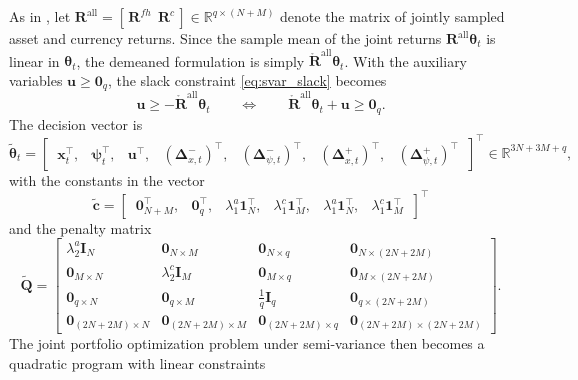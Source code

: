 As in , let $\bm{R}^{\text{all}} = [\, \bm{R}^{fh}\ \ \bm{R}^c \,] \in
\mathbb{R}^{q \times (N+M)}$ denote the matrix of jointly sampled asset and currency returns. Since the sample mean of
the joint returns $\bm{R}^{\text{all}} \bm{\theta}_t$ is linear in $\bm{\theta}_t$, the demeaned formulation is simply
$\mathring{\bm{R}}^{\text{all}} \bm{\theta}_t$. With the auxiliary variables $\bm{u} \ge \bm{0}_q$, the slack
constraint \eqref{eq:svar_slack} becomes
\begin{equation*}
    \bm{u} \ge -\mathring{\bm{R}}^{\text{all}} \bm{\theta}_t
    \qquad \Longleftrightarrow \qquad
    \mathring{\bm{R}}^{\text{all}} \bm{\theta}_t + \bm{u} \ge \bm{0}_q.
\end{equation*}
The decision vector is
\begin{equation*}
    \tilde{\bm{\theta}}_t = \begin{bmatrix}\, \bm{x}_t^\top,& \bm{\psi}_t^\top,& \bm{u}^\top,&
    (\bm{\Delta}_{x,t}^-)^\top,& (\bm{\Delta}_{\psi,t}^-)^\top,&
    (\bm{\Delta}_{x,t}^+)^\top,& (\bm{\Delta}_{\psi,t}^+)^\top \,\end{bmatrix}^\top
    \in \mathbb{R}^{3N+3M+q},
\end{equation*}
with the constants in the vector
\begin{equation*}
    \tilde{\bm{c}} = \begin{bmatrix}\, \bm{0}_{N+M}^\top,& \bm{0}_q^\top,&
    \lambda_1^a \bm{1}_N^\top,& \lambda_1^c \bm{1}_M^\top,&
    \lambda_1^a \bm{1}_N^\top,& \lambda_1^c \bm{1}_M^\top \,\end{bmatrix}^\top
\end{equation*}
and the penalty matrix
\begin{equation*}
    \tilde{\bm{Q}} =
    \begin{bmatrix}
        \lambda_2^a \bm{I}_N & \bm{0}_{N \times M} & \bm{0}_{N \times q} & \bm{0}_{N\times(2N + 2M)} \\
        \bm{0}_{M \times N} & \lambda_2^c \bm{I}_M & \bm{0}_{M \times q} & \bm{0}_{M\times(2N + 2M)} \\
        \bm{0}_{q \times N} & \bm{0}_{q \times M} & \tfrac{1}{q} \bm{I}_q & \bm{0}_{q\times(2N + 2M)} \\
        \bm{0}_{(2N+2M) \times N} & \bm{0}_{(2N+2M) \times M} & \bm{0}_{(2N+2M) \times q}
        & \bm{0}_{(2N+2M) \times (2N+2M)}
    \end{bmatrix}.
\end{equation*}
The joint portfolio optimization problem under semi-variance then becomes a quadratic program with linear constraints
